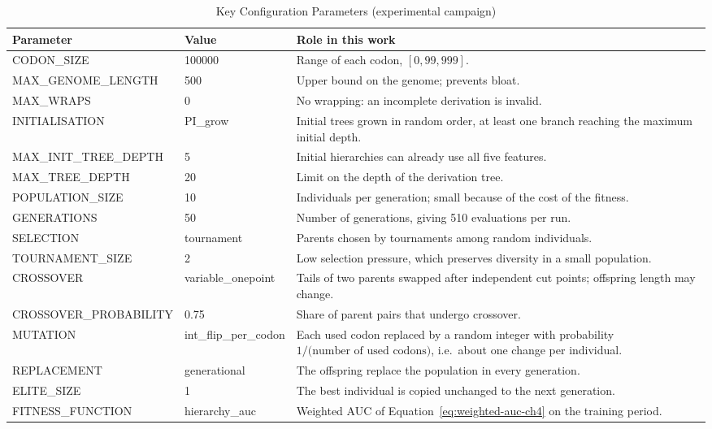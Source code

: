 \begin{table}[htbp]
    \centering
    \caption{Key Configuration Parameters (experimental campaign)}
    \label{tab:ge-params}
    \begin{tabularx}{\textwidth}{llX}
        \toprule
        Parameter & Value & Role in this work \\
        \midrule
        CODON\_SIZE & 100000 & Range of each codon, $[0, 99{,}999]$. \\
        MAX\_GENOME\_LENGTH & 500 & Upper bound on the genome; prevents bloat. \\
        MAX\_WRAPS & 0 & No wrapping: an incomplete derivation is invalid. \\
        INITIALISATION & PI\_grow & Initial trees grown in random order, at least one branch reaching the maximum initial depth. \\
        MAX\_INIT\_TREE\_DEPTH & 5 & Initial hierarchies can already use all five features. \\
        MAX\_TREE\_DEPTH & 20 & Limit on the depth of the derivation tree. \\
        POPULATION\_SIZE & 10 & Individuals per generation; small because of the cost of the fitness. \\
        GENERATIONS & 50 & Number of generations, giving 510 evaluations per run. \\
        SELECTION & tournament & Parents chosen by tournaments among random individuals. \\
        TOURNAMENT\_SIZE & 2 & Low selection pressure, which preserves diversity in a small population. \\
        CROSSOVER & variable\_onepoint & Tails of two parents swapped after independent cut points; offspring length may change. \\
        CROSSOVER\_PROBABILITY & 0.75 & Share of parent pairs that undergo crossover. \\
        MUTATION & int\_flip\_per\_codon & Each used codon replaced by a random integer with probability $1/\text{(number of used codons)}$, i.e.\ about one change per individual. \\
        REPLACEMENT & generational & The offspring replace the population in every generation. \\
        ELITE\_SIZE & 1 & The best individual is copied unchanged to the next generation. \\
        FITNESS\_FUNCTION & hierarchy\_auc & Weighted \ac{AUC} of Equation~\eqref{eq:weighted-auc-ch4} on the training period. \\
        \bottomrule
    \end{tabularx}
\end{table}

